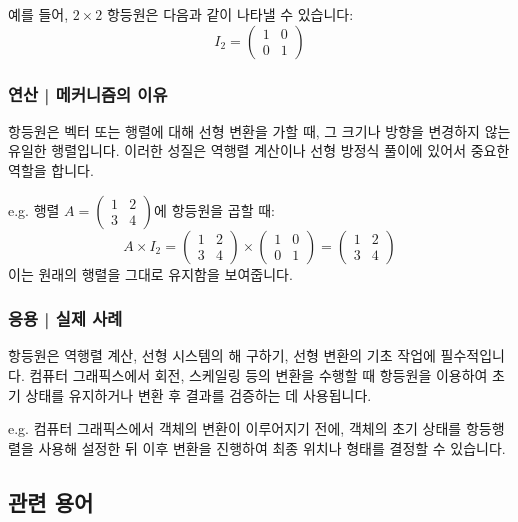 예를 들어, \(2 \times 2\) 항등원은 다음과 같이 나타낼 수 있습니다:
\[
  I_2 = \begin{pmatrix} 1 & 0 \\ 0 & 1 \end{pmatrix}
\]

\subsubsection{연산 | 메커니즘의 이유}
항등원은 벡터 또는 행렬에 대해 선형 변환을 가할 때, 그 크기나 방향을 변경하지 않는 유일한 행렬입니다. 이러한 성질은 역행렬 계산이나 선형 방정식 풀이에 있어서 중요한 역할을 합니다.

\vspace{1\baselineskip}
\noindent {} e.g. 행렬 \( A = \begin{pmatrix} 1 & 2 \\ 3 & 4 \end{pmatrix} \)에 항등원을 곱할 때:
\[
  A \times I_2 = \begin{pmatrix} 1 & 2 \\ 3 & 4 \end{pmatrix} \times \begin{pmatrix} 1 & 0 \\ 0 & 1 \end{pmatrix} = \begin{pmatrix} 1 & 2 \\ 3 & 4 \end{pmatrix}
\]
이는 원래의 행렬을 그대로 유지함을 보여줍니다.

\subsubsection{응용 | 실제 사례}
항등원은 역행렬 계산, 선형 시스템의 해 구하기, 선형 변환의 기초 작업에 필수적입니다. 컴퓨터 그래픽스에서 회전, 스케일링 등의 변환을 수행할 때 항등원을 이용하여 초기 상태를 유지하거나 변환 후 결과를 검증하는 데 사용됩니다.

\vspace{1\baselineskip}
\noindent {} e.g.
컴퓨터 그래픽스에서 객체의 변환이 이루어지기 전에, 객체의 초기 상태를 항등행렬을 사용해 설정한 뒤 이후 변환을 진행하여 최종 위치나 형태를 결정할 수 있습니다.

\subsection{관련 용어}




